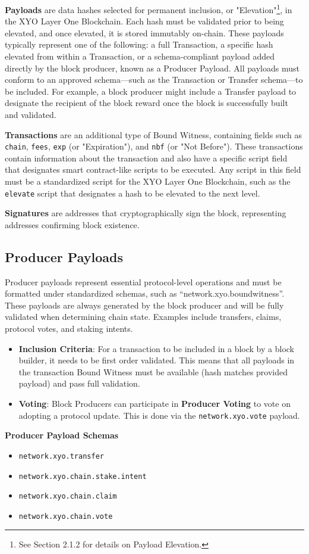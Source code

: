 \documentclass{article}
\begin{document}
\textbf{Payloads} are data hashes selected for permanent inclusion, or "Elevation"\footnote{See Section 2.1.2 for details on Payload Elevation.}, in the XYO Layer One Blockchain. Each hash must be validated prior to being elevated, and once elevated, it is stored immutably on-chain. These payloads typically represent one of the following: a full Transaction, a specific hash elevated from within a Transaction, or a schema-compliant payload added directly by the block producer, known as a Producer Payload. All payloads must conform to an approved schema—such as the Transaction or Transfer schema—to be included. For example, a block producer might include a Transfer payload to designate the recipient of the block reward once the block is successfully built and validated.

\textbf{Transactions} are an additional type of Bound Witness, containing fields such as \texttt{chain}, \texttt{fees}, \texttt{exp} (or "Expiration"), and \texttt{nbf} (or "Not Before"). These transactions contain information about the transaction and also have a specific script field that designates smart contract-like scripts to be executed. Any script in this field must be a standardized script for the XYO Layer One Blockchain, such as the \texttt{elevate} script that designates a hash to be elevated to the next level.

\textbf{Signatures} are addresses that cryptographically sign the block, representing addresses confirming block existence.


\subsection{Producer Payloads}
Producer payloads represent essential protocol-level operations and must be formatted under standardized schemas, such as “network.xyo.boundwitness”. These payloads are always generated by the block producer and will be fully validated when determining chain state. Examples include transfers, claims, protocol votes, and staking intents.

\begin{itemize}
    \item \textbf{Inclusion Criteria}: For a transaction to be included in a block by a block builder, it needs to be first order validated. This means that all payloads in the transaction Bound Witness must be available (hash matches provided payload) and pass full validation.
    \item \textbf{Voting}: Block Producers can participate in \textbf{Producer Voting} to vote on adopting a protocol update. This is done via the \texttt{network.xyo.vote} payload.
\end{itemize}
\textbf{Producer Payload Schemas}
\begin{itemize}
    \item \texttt{network.xyo.transfer}
    \item \texttt{network.xyo.chain.stake.intent}
    \item \texttt{network.xyo.chain.claim}
    \item \texttt{network.xyo.chain.vote}
\end{itemize}
\end{document}
